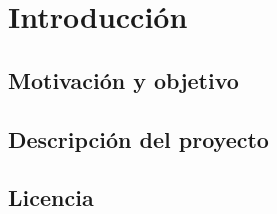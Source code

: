 \chapter{Introducción}

\section{Motivación y objetivo}



\section{Descripción del proyecto}



\section{Licencia}


